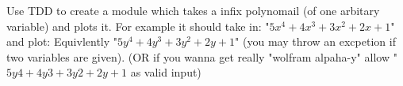 \begin{problem}
Use TDD to create a module which takes a infix polynomail (of one arbitary variable) and plots it. For example it should take in:
"$5x^4 + 4x^3 + 3x^2+ 2x + 1$" and plot:
Equivlently "$5y^4 + 4y^3 + 3y^2+ 2y + 1$" (you may throw an excpetion if two variables are given).
(OR if you wanna get really "wolfram alpaha-y" allow "$5y4 + 4y3 + 3y2+ 2y + 1$ as valid input)
\end{problem}


